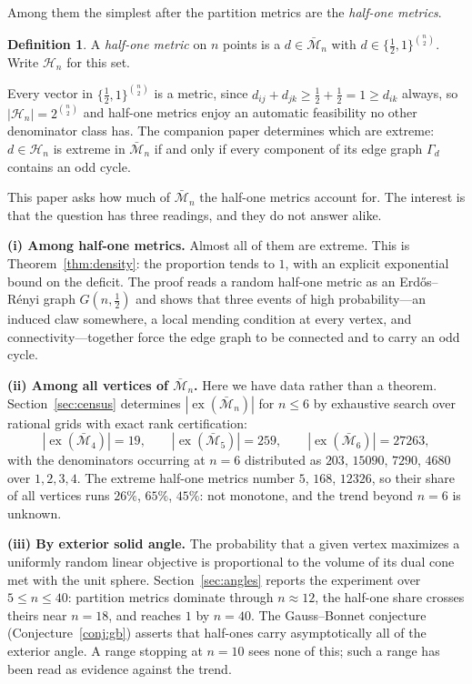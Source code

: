 \documentclass[11pt]{article}
\theoremstyle{definition}
\newtheorem{definition}[theorem]{Definition}
\theoremstyle{remark}
\newcommand{\bM}{\bar{\mathcal{M}}}
\newcommand{\Ha}{\mathcal{H}}
\newcommand{\ex}{\operatorname{ex}}
\begin{document}
Among them the simplest after the partition metrics are the \emph{half-one metrics}.

\begin{definition}\label{def:halfone}
A \emph{half-one metric} on $n$ points is a $d\in\bM_n$ with
$d\in\{\tfrac12,1\}^{\binom n2}$. Write $\Ha_n$ for this set.
\end{definition}

Every vector in $\{\tfrac12,1\}^{\binom n2}$ is a metric, since
$d_{ij}+d_{jk}\geq\tfrac12+\tfrac12=1\geq d_{ik}$ always, so $|\Ha_n|=2^{\binom n2}$ and
half-one metrics enjoy an automatic feasibility no other denominator class has. The
companion paper \cite{FK-cone} determines which are extreme: $d\in\Ha_n$ is extreme in
$\bM_n$ if and only if every component of its edge graph $\Gamma_d$ contains an odd cycle.

This paper asks how much of $\bM_n$ the half-one metrics account for. The interest is that
the question has three readings, and they do not answer alike.

\smallskip
\noindent\textbf{(i) Among half-one metrics.} Almost all of them are extreme. This is
Theorem~\ref{thm:density}: the proportion tends to $1$, with an explicit exponential bound
on the deficit. The proof reads a random half-one metric as an Erd\H{o}s--R\'enyi graph
$G(n,\tfrac12)$ and shows that three events of high probability---an induced claw somewhere,
a local mending condition at every vertex, and connectivity---together force the edge graph
to be connected and to carry an odd cycle.

\smallskip
\noindent\textbf{(ii) Among all vertices of $\bM_n$.} Here we have data rather than a
theorem. Section~\ref{sec:census} determines $|\ex(\bM_n)|$ for $n\leq6$ by exhaustive
search over rational grids with exact rank certification:
\[
|\ex(\bM_4)|=19,\qquad |\ex(\bM_5)|=259,\qquad |\ex(\bM_6)|=27263,
\]
with the denominators occurring at $n=6$ distributed as $203$, $15090$, $7290$, $4680$ over
$1,2,3,4$. The extreme half-one metrics number $5$, $168$, $12326$, so their share of all
vertices runs $26\%$, $65\%$, $45\%$: not monotone, and the trend beyond $n=6$ is unknown.

\smallskip
\noindent\textbf{(iii) By exterior solid angle.} The probability that a given vertex
maximizes a uniformly random linear objective is proportional to the volume of its dual
cone met with the unit sphere. Section~\ref{sec:angles} reports the experiment over
$5\leq n\leq40$: partition metrics dominate through $n\approx12$, the half-one share
crosses theirs near $n=18$, and reaches $1$ by $n=40$. The Gauss--Bonnet conjecture
(Conjecture~\ref{conj:gb}) asserts that half-ones carry asymptotically all of the
exterior angle. A range stopping at $n=10$ sees none of this; such a range has been read
as evidence against the trend.
\end{document}
